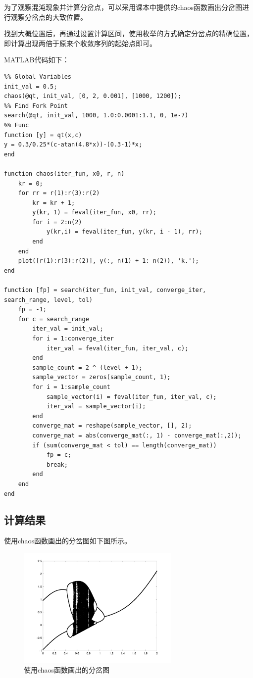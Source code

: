 \documentclass{article}
\begin{document}
为了观察混沌现象并计算分岔点，可以采用课本中提供的chaos函数画出分岔图进行观察分岔点的大致位置。

找到大概位置后，再通过设置计算区间，使用枚举的方式确定分岔点的精确位置，即计算出现两倍于原来个收敛序列的起始点即可。

MATLAB代码如下：
\begin{lstlisting}
%% Global Variables
init_val = 0.5;
chaos(@qt, init_val, [0, 2, 0.001], [1000, 1200]);
%% Find Fork Point
search(@qt, init_val, 1000, 1.0:0.0001:1.1, 0, 1e-7)
%% Func
function [y] = qt(x,c)
y = 0.3/0.25*(c-atan(4.8*x))-(0.3-1)*x;
end

function chaos(iter_fun, x0, r, n)
    kr = 0;
    for rr = r(1):r(3):r(2)
        kr = kr + 1;
        y(kr, 1) = feval(iter_fun, x0, rr);
        for i = 2:n(2)
            y(kr,i) = feval(iter_fun, y(kr, i - 1), rr);
        end
    end
    plot([r(1):r(3):r(2)], y(:, n(1) + 1: n(2)), 'k.');
end

function [fp] = search(iter_fun, init_val, converge_iter, search_range, level, tol)
    fp = -1;
    for c = search_range
        iter_val = init_val;
        for i = 1:converge_iter
            iter_val = feval(iter_fun, iter_val, c);
        end
        sample_count = 2 ^ (level + 1);
        sample_vector = zeros(sample_count, 1);
        for i = 1:sample_count
            sample_vector(i) = feval(iter_fun, iter_val, c);
            iter_val = sample_vector(i);
        end
        converge_mat = reshape(sample_vector, [], 2);
        converge_mat = abs(converge_mat(:, 1) - converge_mat(:,2));
        if (sum(converge_mat < tol) == length(converge_mat))
            fp = c;
            break;
        end
    end
end
\end{lstlisting}

\subsection{计算结果}
使用chaos函数画出的分岔图如下图所示。
\begin{figure}[H]
    \centering
    \includegraphics[width=0.7\textwidth]{pic81.png}
    \caption{使用chaos函数画出的分岔图}
\end{figure}
\end{document}
